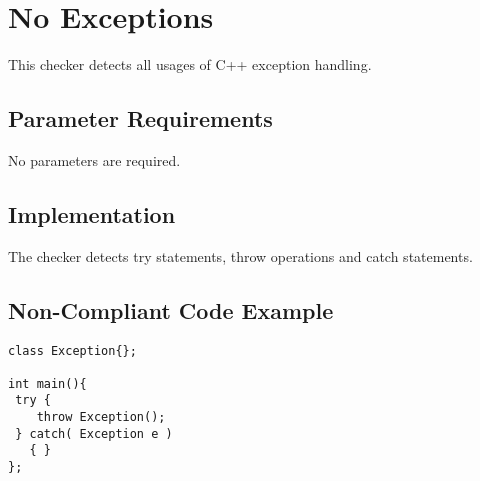 %
%

\section{No Exceptions}
\label{NoExceptions::overview}
This checker detects all usages of C++ exception handling.

\subsection{Parameter Requirements}
No parameters are required.

\subsection{Implementation}
The checker detects try statements, throw operations and catch statements.

\subsection{Non-Compliant Code Example}


\begin{verbatim}
class Exception{};

int main(){
 try {
    throw Exception();
 } catch( Exception e )
   { }
};
\end{verbatim}

